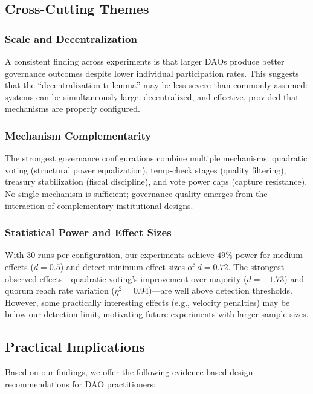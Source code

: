 \subsection{Cross-Cutting Themes}

\subsubsection{Scale and Decentralization}

A consistent finding across experiments is that larger DAOs produce better governance outcomes despite lower individual participation rates. This suggests that the ``decentralization trilemma'' may be less severe than commonly assumed: systems can be simultaneously large, decentralized, and effective, provided that mechanisms are properly configured.

\subsubsection{Mechanism Complementarity}

The strongest governance configurations combine multiple mechanisms: quadratic voting (structural power equalization), temp-check stages (quality filtering), treasury stabilization (fiscal discipline), and vote power caps (capture resistance). No single mechanism is sufficient; governance quality emerges from the interaction of complementary institutional designs.

\subsubsection{Statistical Power and Effect Sizes}

With 30 runs per configuration, our experiments achieve $49\%$ power for medium effects ($d = 0.5$) and detect minimum effect sizes of $d = 0.72$. The strongest observed effects---quadratic voting's improvement over majority ($d = -1.73$) and quorum reach rate variation ($\eta^2 = 0.94$)---are well above detection thresholds. However, some practically interesting effects (e.g., velocity penalties) may be below our detection limit, motivating future experiments with larger sample sizes.

\subsection{Practical Implications}

Based on our findings, we offer the following evidence-based design recommendations for DAO practitioners:

